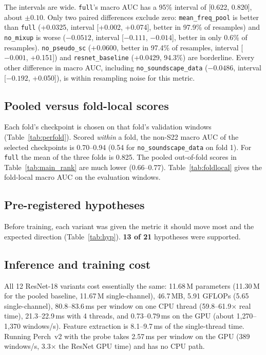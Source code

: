 \documentclass[11pt]{article}
\newcommand{\var}[1]{\texttt{#1}}
\begin{document}


The intervals are wide. \var{full}'s macro AUC has a 95\% interval of
[0.622, 0.820], about $\pm0.10$. Only two paired differences exclude zero:
\var{mean\_freq\_pool} is better than \var{full} (+0.0325, interval
[+0.002, +0.074], better in 97.9\% of resamples) and \var{no\_mixup} is worse
($-0.0512$, interval [$-0.111$, $-0.014$], better in only 0.6\% of
resamples). \var{no\_pseudo\_sc} (+0.0600, better in 97.4\% of resamples,
interval [$-0.001$, +0.151]) and \var{resnet\_baseline} (+0.0429, 94.3\%)
are borderline. Every other difference in macro AUC, including
\var{no\_soundscape\_data} ($-0.0486$, interval [$-0.192$, +0.050]), is
within resampling noise for this metric.

\subsection{Pooled versus fold-local scores}
\label{sec:pooled}
Each fold's checkpoint is chosen on that fold's validation windows
(Table~\ref{tab:perfold}). Scored \emph{within} a fold, the non-S22 macro AUC
of the selected checkpoints is 0.70--0.94 (0.54 for \var{no\_soundscape\_data}
on fold 1). For \var{full} the mean of the three folds is 0.825. The pooled out-of-fold scores in
Table~\ref{tab:main_rank} are much lower (0.66--0.77). Table~\ref{tab:foldlocal}
gives the fold-local macro AUC on the evaluation windows.




\subsection{Pre-registered hypotheses}
Before training, each variant was given the metric it should move most and
the expected direction (Table~\ref{tab:hyp}). \textbf{13 of 21} hypotheses
were supported.



\subsection{Inference and training cost}


All 12 ResNet-18 variants cost essentially the same: 11.68\,M parameters
(11.30\,M for the pooled baseline, 11.67\,M single-channel), 46.7\,MB, 5.91
GFLOPs (5.65 single-channel), 80.8--83.6\,ms per window on one CPU thread
(59.8--61.9$\times$ real time), 21.3--22.9\,ms with 4 threads, and
0.73--0.79\,ms on the GPU (about 1{,}270--1{,}370 windows/s). Feature
extraction is 8.1--9.7\,ms of the single-thread time. Running Perch~v2 with
the probe takes 2.57\,ms per window on the GPU (389 windows/s, 3.3$\times$ the
ResNet GPU time) and has no CPU path.
\end{document}
